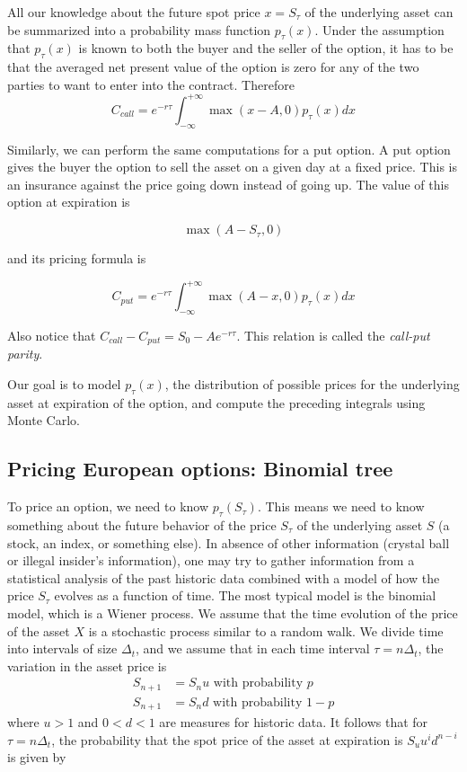 \documentclass[justified,sixbynine]{tufte-book}
\theoremstyle{plain}%
\theoremstyle{definition}
\theoremstyle{remark}
\begin{document}
\begin{fullwidth}
All our knowledge about the future spot price $x=S_\tau $ of the underlying
asset can be summarized into a probability mass function $p_\tau (x)$. Under
the assumption that $p_\tau (x)$ is known to both the buyer and the seller
of the option, it has to be that the averaged net present value of the
option is zero for any of the two parties to want to enter into the contract.
Therefore
\begin{equation}
C_{call}=e^{-r\tau }\int_{-\infty }^{+\infty }\max (x-A,0)p_\tau (x)dx
\label{call_option}
\end{equation}


Similarly, we can perform the same computations for a put option. A put option gives the buyer the option to sell the asset on a given day at a fixed price. This is an insurance against the price going down instead of going up. The value of this option at expiration is

\begin{equation}
\max (A-S_\tau,0)
\end{equation}

and its pricing formula is

\begin{equation}
C_{put}=e^{-r\tau }\int_{-\infty }^{+\infty }\max (A-x,0)p_\tau (x)dx
\label{put_option}
\end{equation}

Also notice that $C_{call}-C_{put} = S_0 - A e^{-r\tau }$.
This relation is called the {\it call-put parity}.

Our goal is to model $p_\tau(x)$, the distribution of possible prices for the underlying asset at expiration of the option, and compute the preceding integrals using Monte Carlo.

\goodbreak\subsection{Pricing European options: Binomial tree}

To price an option, we need to know $p_\tau (S_\tau )$. This means we need to
know something about the future behavior of the price $S_\tau $ of the
underlying asset $S$ (a stock, an index, or something else). In absence of
other information (crystal ball or illegal insider's information), one may
try to gather information from a statistical analysis of the past historic
data combined with a model of how the price $S_\tau $ evolves as a function of
time. The most typical model is the binomial model, which is a Wiener
process. We assume that the time evolution of the price of the asset $X$ is a
stochastic process similar to a random walk. We divide time into
intervals of size $\Delta _t$, and we assume that in each time interval $\tau
=n\Delta _t$, the variation in the asset price is
\begin{align}
S_{n+1} &= S_nu\text{ with probability }p \\
S_{n+1} &= S_nd\text{ with probability }1-p
\end{align}
where $u>1$ and $0<d<1$ are measures for historic data. It follows that for $%
\tau =n\Delta _t$, the probability that the spot price of the asset at
expiration is $S_uu^id^{n-i}$ is given by


\end{fullwidth}
\end{document}
